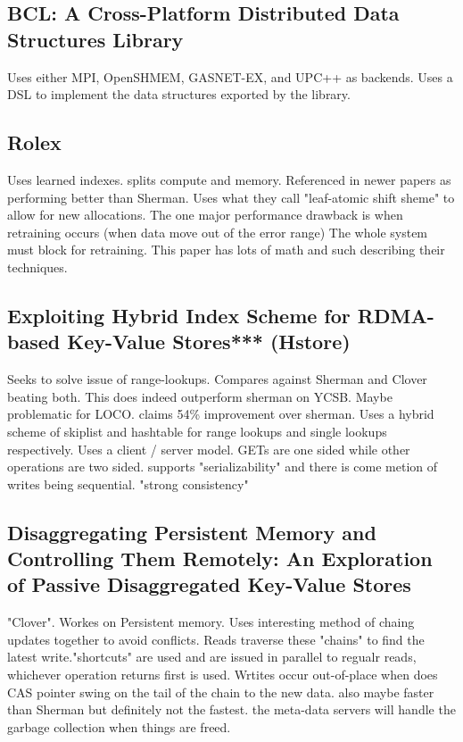\documentclass[sigplan,nonacm]{acmart}
\begin{document}
    \subsection{BCL: A Cross-Platform Distributed Data Structures Library}
    Uses either MPI, OpenSHMEM, GASNET-EX, and UPC++ as backends. Uses a DSL to implement the data structures 
    exported by the library. \cite{Brock-ICPP-2019}
    
    \subsection{Rolex}
    Uses learned indexes. splits compute and memory. Referenced in newer papers as performing better than Sherman.
    Uses what they call "leaf-atomic shift sheme" to allow for new allocations. The one major performance drawback 
    is when retraining occurs (when data move out of the error range) The whole system must block for retraining. 
    This paper has lots of math and such describing their techniques. \cite{Li-FAST-2023}

    \subsection{Exploiting Hybrid Index Scheme for RDMA-based Key-Value Stores*** (Hstore)}
    Seeks to solve issue of range-lookups. Compares against Sherman and Clover beating both. 
    This does indeed outperform sherman on YCSB. Maybe problematic for LOCO. claims 54\% improvement 
    over sherman. Uses a hybrid scheme of skiplist and hashtable for range lookups and single lookups respectively.
    Uses a client / server model. GETs are one sided while other operations are two sided. supports "serializability"
    and there is come metion of writes being sequential. "strong consistency"\cite{Han-SYSTOR-2023}

    \subsection{Disaggregating Persistent Memory and Controlling Them Remotely: An Exploration of Passive Disaggregated Key-Value Stores}
    "Clover". Workes on Persistent memory. Uses interesting method of chaing updates together to avoid conflicts. Reads traverse
    these "chains" to find the latest write."shortcuts" are used and are issued in parallel to regualr reads, whichever 
    operation returns first is used. Wrtites occur out-of-place when does CAS pointer swing on the tail of the chain to the new data. also maybe faster 
    than Sherman but definitely not the fastest. the meta-data servers will handle the garbage collection when things are freed.\cite{Tsai-USENIX-2020}
\end{document}
